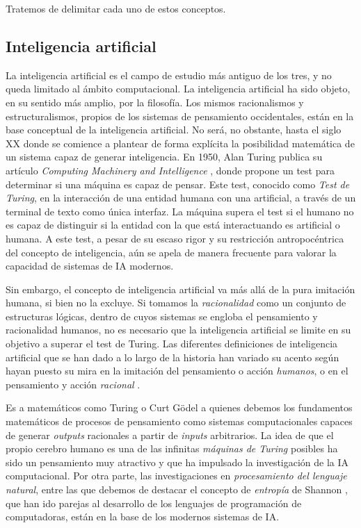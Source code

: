 Tratemos de delimitar cada uno de estos conceptos.

\subsection{Inteligencia artificial}

La inteligencia artificial es el campo de estudio más antiguo de los tres, y no queda limitado al ámbito computacional. La inteligencia artificial ha sido objeto, en su sentido más amplio, por la filosofía. Los mismos racionalismos y estructuralismos, propios de los sistemas de pensamiento occidentales, están en la base conceptual de la inteligencia artificial. No será, no obstante, hasta el siglo XX donde se comience a plantear de forma explícita la posibilidad matemática de un sistema capaz de generar inteligencia. En 1950, Alan Turing publica su artículo \textit{Computing Machinery and Intelligence} \citep{alan1950a}, donde propone un test para determinar si una máquina es capaz de pensar. Este test, conocido como \textit{Test de Turing}, en la interacción de una entidad humana con una artificial, a través de un terminal de texto como única interfaz. La máquina supera el test si el humano no es capaz de distinguir si la entidad con la que está interactuando es artificial o humana. A este test, a pesar de su escaso rigor y su restricción antropocéntrica del concepto de inteligencia, aún se apela de manera frecuente para valorar la capacidad de sistemas de IA modernos.

Sin embargo, el concepto de inteligencia artificial va más allá de la pura imitación humana, si bien no la excluye. Si tomamos la \emph{racionalidad} como un conjunto de estructuras lógicas, dentro de cuyos sistemas se engloba el pensamiento y racionalidad humanos, no es necesario que la inteligencia artificial se limite en su objetivo a superar el test de Turing. Las diferentes definiciones de inteligencia artificial que se han dado a lo largo de la historia han variado su acento según hayan puesto su mira en la imitación del pensamiento o acción \emph{humanos}, o en el pensamiento y acción \emph{racional} \citep{RussellStuartJ2021AI:A}.

Es a matemáticos como Turing o Curt Gödel a quienes debemos los fundamentos matemáticos de procesos de pensamiento como sistemas computacionales capaces de generar \textit{outputs} racionales a partir de \textit{inputs} arbitrarios. La idea de que el propio cerebro humano es una de las infinitas \emph{máquinas de Turing} posibles \citep{penroseNuevaMenteEmperador2015} ha sido un pensamiento muy atractivo y que ha impulsado la investigación de la IA computacional. Por otra parte, las investigaciones en \textit{procesamiento del lenguaje natural}, entre las que debemos de destacar el concepto de \emph{entropía} de Shannon \citep{shannon1951prediction}, que han ido parejas al desarrollo de los lenguajes de programación de computadoras, están en la base de los modernos sistemas de IA.

